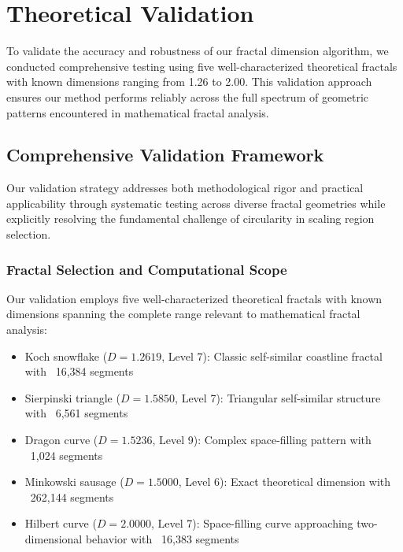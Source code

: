 \documentclass[preprint,12pt]{elsarticle}
\def\textbf#1{#1}%
\begin{document}
\section{Theoretical Validation}

To validate the accuracy and robustness of our fractal dimension algorithm, we conducted comprehensive testing using five well-characterized theoretical fractals with known dimensions ranging from 1.26 to 2.00. This validation approach ensures our method performs reliably across the full spectrum of geometric patterns encountered in mathematical fractal analysis.

\subsection{Comprehensive Validation Framework}
\label{subsec:validation_framework}

Our validation strategy addresses both methodological rigor and practical applicability through systematic testing across diverse fractal geometries while explicitly resolving the fundamental challenge of circularity in scaling region selection.

\subsubsection{Fractal Selection and Computational Scope}

Our validation employs five well-characterized theoretical fractals with known dimensions spanning the complete range relevant to mathematical fractal analysis:

\begin{itemize}
\item \textbf{Koch snowflake} ($D = 1.2619$, Level 7): Classic self-similar coastline fractal with ~16,384 segments
\item \textbf{Sierpinski triangle} ($D = 1.5850$, Level 7): Triangular self-similar structure with ~6,561 segments
\item \textbf{Dragon curve} ($D = 1.5236$, Level 9): Complex space-filling pattern with ~1,024 segments
\item \textbf{Minkowski sausage} ($D = 1.5000$, Level 6): Exact theoretical dimension with ~262,144 segments
\item \textbf{Hilbert curve} ($D = 2.0000$, Level 7): Space-filling curve approaching two-dimensional behavior with ~16,383 segments
\end{itemize}
\end{document}
